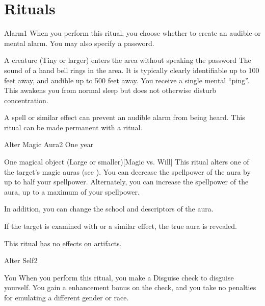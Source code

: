 \section{Rituals}

\small

\begin{spellsection}{Alarm}{1}
\spelldur \durext \dismissable
{}
\spellspecial When you perform this ritual, you choose whether to create an audible or mental alarm. You may also specify a password.
\spellline
\begin{spelltrigger}{A creature (Tiny or larger) enters the area without speaking the password}
     The sound of a hand bell rings in the area. It is typically clearly identifiable up to 100 feet away, and audible up to 500 feet away.
     You receive a single mental ``ping''. This awakens you from normal sleep but does not otherwise disturb concentration.
\end{spelltrigger}
\spellnotes A  spell or similar effect can prevent an audible alarm from being heard. This ritual can be made permanent with a  ritual.
\end{spellsection}

\begin{spellsection}{Alter Magic Aura}{2}
\spelldur One year \dismissable
\begin{spelltarget}{One magical object (Large or smaller)}[Magic vs. Will]
    \spellsuccess This ritual alters one of the target's magic auras (see ). You can decrease the spellpower of the aura by up to half your spellpower. Alternately, you can increase the spellpower of the aura, up to a maximum of your spellpower.

    In addition, you can change the school and descriptors of the aura.
\end{spelltarget}
\spellnotes If the target is examined with  or a similar effect, the true aura is revealed.

\par This ritual has no effects on artifacts.
\end{spellsection}

\begin{spellsection}{Alter Self}{2}
\spelldur \durlong
\begin{spelltarget}{You}
    \spelleffect When you perform this ritual, you make a Disguise check to disguise yourself. You gain a  enhancement bonus on the check, and you take no penalties for emulating a different gender or race.
\end{spelltarget}
\end{spellsection}


